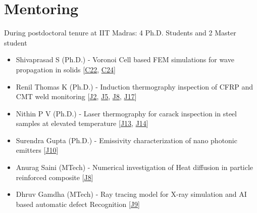 \documentclass{my_cv}%
\begin{document}
\section{Mentoring}
\vspace{1em}
\noindent \faEye \hspace{1em} \color{mygray} During postdoctoral tenure at IIT Madras: 4 Ph.D. Students and 2 Master student 
\begin{itemize}[leftmargin=0.15in]
\setlength\itemsep{-0.1em}
\color{mygray}
\item Shivaprasad S (Ph.D.) - Voronoi Cell based FEM simulations for wave propagation in solids [\textcolor{mypink}{\hyperref[C22]{C22}}, \textcolor{mypink}{\hyperref[C24]{C24}}]
\item Renil Thomas K (Ph.D.) - Induction thermography inspection of CFRP and CMT weld monitoring [\textcolor{mypink}{\hyperref[J2]{J2}}, \textcolor{mypink}{\hyperref[J5]{J5}}, \textcolor{mypink}{\hyperref[J8]{J8}}, \textcolor{mypink}{\hyperref[J17]{J17}}] 
\item Nithin P V (Ph.D.) - Laser thermography for carack inspection in steel samples at elevated temperature [\textcolor{mypink}{\hyperref[J13]{J13}}, \textcolor{mypink}{\hyperref[J14]{J14}}]
\item Surendra Gupta (Ph.D.) - Emissivity characterization of nano photonic emitters [\textcolor{mypink}{\hyperref[J10]{J10}}]
\item Anurag Saini (MTech) - Numerical investigation of Heat diffusion in particle reinforced composite [\textcolor{mypink}{\hyperref[J8]{J8}}]
\item Dhruv Gamdha (MTech) - Ray tracing model for X-ray simulation and AI based automatic defect Recognition [\textcolor{mypink}{\hyperref[J9]{J9}}]
\end{itemize}
\end{document}
